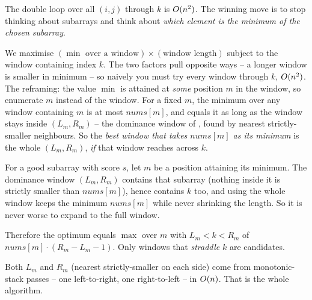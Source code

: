 \begin{attemptgate}
The double loop over all $(i,j)$ through $k$ is $O(n^2)$. The winning move is to stop thinking about
subarrays and think about \emph{which element is the minimum of the chosen subarray}.
\end{attemptgate}

We maximise $(\min \text{ over a window}) \times (\text{window length})$ subject to the window
containing index $k$. The two factors pull opposite ways -- a longer window is smaller in minimum -- so
naively you must try every window through $k$, $O(n^2)$. The reframing: the value $\min$ is attained
at \emph{some} position $m$ in the window, so enumerate $m$ instead of the window. For a fixed $m$,
the minimum over any window containing $m$ is at most $\mathit{nums}[m]$, and equals it as long as the
window stays inside $(L_m, R_m)$ -- the dominance window of , found by nearest
strictly-smaller neighbours. So the \emph{best window that takes $\mathit{nums}[m]$ as its minimum} is
the whole $(L_m, R_m)$, \emph{if} that window reaches across $k$.

\begin{observation}
For a good subarray with score $s$, let $m$ be a position attaining its minimum. The dominance window
$(L_m, R_m)$ contains that subarray (nothing inside it is strictly smaller than $\mathit{nums}[m]$),
hence contains $k$ too, and using the whole window keeps the minimum $\mathit{nums}[m]$ while never
shrinking the length. So it is never worse to expand to the full window.
\end{observation}
\begin{observation}
Therefore the optimum equals $\max$ over $m$ with $L_m < k < R_m$ of
$\mathit{nums}[m]\cdot(R_m - L_m - 1)$. Only windows that \emph{straddle} $k$ are candidates.
\end{observation}
\begin{observation}
Both $L_m$ and $R_m$ (nearest strictly-smaller on each side) come from monotonic-stack passes -- one
left-to-right, one right-to-left -- in $O(n)$. That is the whole algorithm.
\end{observation}

